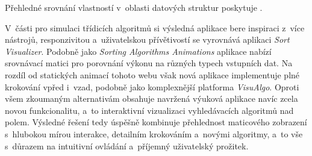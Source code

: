 Přehledné srovnání vlastností v~oblasti datových struktur poskytuje .

\begin{table}[H]
    \centering
    \caption{Srovnání výsledné aplikace s~existujícími nástroji pro datové struktury}
    \label{tab:final_comparison_ds}
\end{table}

V~části pro simulaci třídicích algoritmů si výsledná aplikace bere inspiraci z~více nástrojů, responzivitou a~uživatelskou přívětivostí se vyrovnává aplikaci \textit{Sort Visualizer}.
Podobně jako \textit{Sorting Algorithms Animations} aplikace nabízí srovnávací matici pro porovnání výkonu na různých typech vstupních dat.
Na rozdíl od statických animací tohoto webu však nová aplikace implementuje plné krokování vpřed i~vzad, podobně jako komplexnější platforma \textit{VisuAlgo}.
Oproti všem zkoumaným alternativám obsahuje navržená výuková aplikace navíc zcela novou funkcionalitu, a~to interaktivní vizualizaci vyhledávacích algoritmů nad polem.
Výsledné řešení tedy úspěšně kombinuje přehlednost maticového zobrazení s~hlubokou mírou interakce, detailním krokováním a~novými algoritmy, a~to vše s~důrazem na intuitivní ovládání a~příjemný uživatelský prožitek.~\cite{sortVisualizer,visualgo,toptalSorting}


